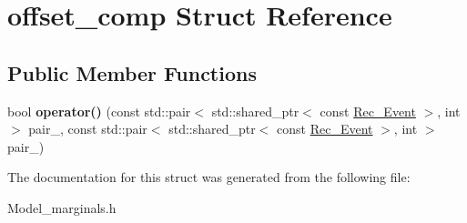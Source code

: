 \hypertarget{structoffset__comp}{}\section{offset\+\_\+comp Struct Reference}
\label{structoffset__comp}
\subsection*{Public Member Functions}
\begin{DoxyCompactItemize}
\item 
\mbox{\label{structoffset__comp_a1da7d270adf54740df0205ff50aa8ae9}} 
bool {\bfseries operator()} (const std\+::pair$<$ std\+::shared\+\_\+ptr$<$ const \hyperlink{classRec__Event}{Rec\+\_\+\+Event} $>$, int $>$ pair\+\_, const std\+::pair$<$ std\+::shared\+\_\+ptr$<$ const \hyperlink{classRec__Event}{Rec\+\_\+\+Event} $>$, int $>$ pair\+\_)
\end{DoxyCompactItemize}


The documentation for this struct was generated from the following file\+:\begin{DoxyCompactItemize}
\item 
Model\+\_\+marginals.\+h\end{DoxyCompactItemize}
